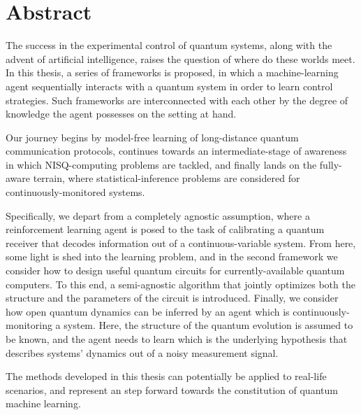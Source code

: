 \chapter*{Abstract}
The success in the experimental control of quantum systems, along with the advent of artificial intelligence, raises the question of where do these worlds meet. In this thesis, a series of frameworks is proposed, in which a machine-learning agent sequentially interacts with a quantum system in order to learn control strategies. Such frameworks are interconnected with each other by the degree of knowledge the agent possesses on the setting at hand.

Our journey begins by model-free learning of long-distance quantum communication protocols, continues towards an intermediate-stage of awareness in which NISQ-computing problems are tackled, and finally lands on the fully-aware terrain, where statistical-inference problems are considered for continuously-monitored systems.

Specifically, we depart from a completely agnostic assumption, where a reinforcement learning agent is posed to the task of calibrating a quantum receiver that decodes information out of a continuous-variable system. From here, some light is shed into the learning problem, and in the second framework we consider how to design useful quantum circuits for currently-available quantum computers. To this end, a semi-agnostic algorithm that jointly optimizes both the structure and the parameters of the circuit is introduced. Finally, we consider how open quantum dynamics can be inferred by an agent which is continuously-monitoring a system. Here, the structure of the quantum evolution is assumed to be known, and the agent needs to learn which is the underlying hypothesis that describes systems’ dynamics out of a noisy measurement signal.

The methods developed in this thesis can potentially be applied to real-life scenarios, and represent an step forward towards the constitution of quantum machine learning.

